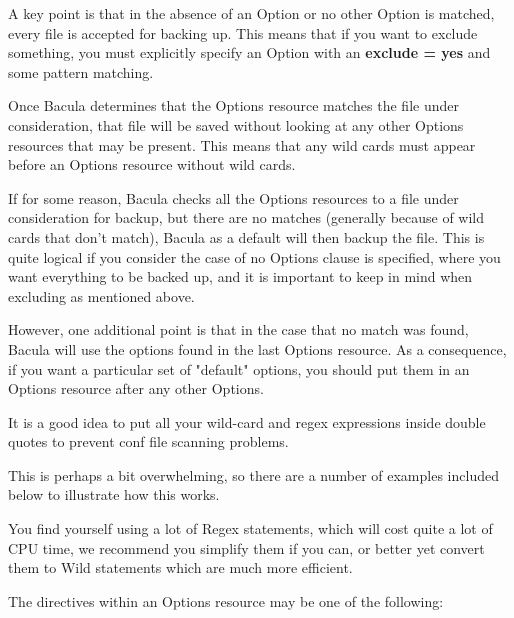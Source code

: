 A key point is that in the absence of an Option or no other Option is
matched, every file is accepted for backing up. This means that if
you want to exclude something, you must explicitly specify an Option
with an {\bf exclude = yes} and some pattern matching.

Once Bacula determines that the Options resource matches the file under
consideration, that file will be saved without looking at any other Options
resources that may be present.  This means that any wild cards must appear
before an Options resource without wild cards.

If for some reason, Bacula checks all the Options resources to a file under
consideration for backup, but there are no matches (generally because of wild
cards that don't match), Bacula as a default will then backup the file.  This
is quite logical if you consider the case of no Options clause is specified,
where you want everything to be backed up, and it is important to keep in mind
when excluding as mentioned above.

However, one additional point is that in the case that no match was found,
Bacula will use the options found in the last Options resource.  As a
consequence, if you want a particular set of "default" options, you should put
them in an Options resource after any other Options.

It is a good idea to put all your wild-card and regex expressions inside
double quotes to prevent conf file scanning problems.

This is perhaps a bit overwhelming, so there are a number of examples included 
below to illustrate how this works.

You find yourself using a lot of Regex statements, which will cost quite a lot
of CPU time, we recommend you simplify them if you can, or better yet
convert them to Wild statements which are much more efficient.

The directives within an Options resource may be one of the following: 

